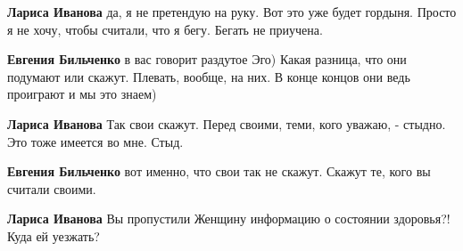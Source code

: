 \begin{itemize}
\begin{itemize}
 
\textbf{Лариса Иванова} да, я не претендую на руку. Вот это уже будет гордыня.
Просто я не хочу, чтобы считали, что я бегу. Бегать не приучена.

 
\textbf{Евгения Бильченко} в вас говорит раздутое Эго) Какая разница, что они
подумают или скажут. Плевать, вообще, на них. В конце концов они ведь проиграют
и мы это знаем)

 
\textbf{Лариса Иванова} Так свои скажут. Перед своими, теми, кого уважаю, - стыдно. Это тоже имеется во мне. Стыд.

 
\textbf{Евгения Бильченко} вот именно, что свои так не скажут. Скажут те, кого вы считали своими.

 
\textbf{Лариса Иванова} Вы пропустили Женщину информацию о состоянии здоровья?! Куда ей уезжать?

 

\end{itemize}
\end{itemize}
